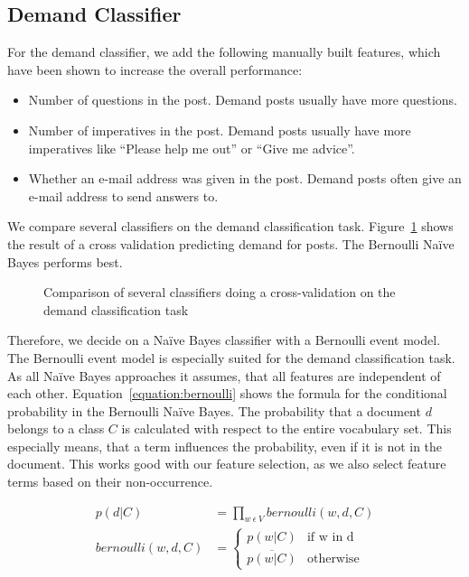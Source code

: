 \subsection{Demand Classifier}
For the demand classifier, we add the following manually built features, which have been shown to increase the overall performance:
\begin{itemize}
	\item Number of questions in the post. Demand posts usually have more questions.
	\item Number of imperatives in the post. Demand posts usually have more imperatives like ``Please help me out'' or ``Give me advice''.
	\item Whether an e-mail address was given in the post. Demand posts often give an e-mail address to send answers to.
\end{itemize}

We compare several classifiers on the demand classification task. 
Figure~\ref{fig:compare-demand} shows the result of a cross validation predicting demand for posts.
The Bernoulli Na\"{i}ve Bayes performs best.

\begin{figure}
	\begin{center}
	\end{center}
	\caption{Comparison of several classifiers doing a cross-validation on the demand classification task}
	\label{fig:compare-demand}
\end{figure}

Therefore, we decide on a Na\"{i}ve Bayes classifier with a Bernoulli event model.
The Bernoulli event model is especially suited for the demand classification task.
As all Na\"{i}ve Bayes approaches it assumes, that all features are independent of each other.
Equation~\ref{equation:bernoulli} shows the formula for the conditional probability in the Bernoulli Na\"{i}ve Bayes.
The probability that a document $d$ belongs to a class $C$ is calculated with respect to the entire vocabulary set.
This especially means, that a term influences the probability, even if it is not in the document.
This works good with our feature selection, as we also select feature terms based on their non-occurrence.

\captionsetup{singlelinecheck=off}
\begin{equationBlock}
\begin{align*}
	p(d|C) &= \prod_{w~\epsilon~V} bernoulli(w, d, C) \\
	bernoulli(w, d, C) &=
	\begin{cases}
		p(w|C) 					&\text{if w in d}\\
		\overline{p(w|C)} 		&\text{otherwise}
	\end{cases}
	\end{align*}
	\caption{
		Bernoulli Na\"{i}ve Bayes~\cite{mccallum1998comparison} definition.
		It describes the probability that a document $d$ is generated for class $C$.
		A document consists of terms $w$.
		The set of all terms $w$ forms the vocabulary $V$.
	}
	\label{equation:bernoulli}
\end{equationBlock}

